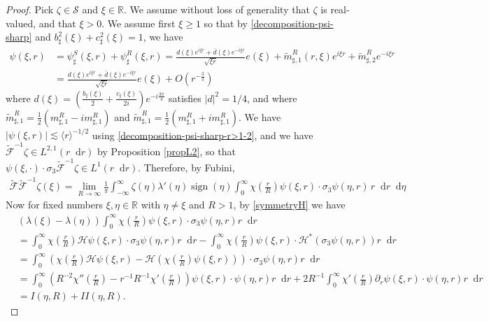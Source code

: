\documentclass[11 pt]{amsart}
\theoremstyle{definition}
\theoremstyle{remark}
\numberwithin{equation}{section}
\newcommand{\dd}{\mathop{}\!\mathrm{d}}
\begin{document}
\begin{proof}
Pick $\zeta \in \mathcal S$ and $\xi\in \mathbb R$. We assume without loss of generality that $\zeta$ is real-valued, and that $\xi>0$. We assume first $\xi\geq 1$ so that by \eqref{decomposition-psi-sharp} and $b_\sharp^2(\xi)+c_\sharp^2(\xi)=1$, we have
\begin{align}
\label{decomposition-psi-sharp-r>1-1} \psi(\xi,r) &=\psi_\sharp^S(\xi,r) +\psi_\sharp^R(\xi,r)  = \frac{d(\xi)e^{i\xi r}+\bar d(\xi)e^{-i\xi r}}{\sqrt{\xi r}} e(\xi)+\widetilde m_{\sharp,1}^R(r,\xi)e^{i\xi r}+\widetilde m_{\sharp,2}^R e^{-i\xi r} \\
\label{decomposition-psi-sharp-r>1-2}& =  \frac{d(\xi)e^{i\xi r}+\bar d(\xi)e^{-i\xi r}}{\sqrt{\xi r}} e(\xi)+O\left(r^{-\frac 32}\right)
\end{align}
where $d(\xi)=(\frac{b_\sharp(\xi)}{2}+\frac{c_\sharp(\xi)}{2i})e^{-i\frac{3\pi}{4}}$ satisfies $|d|^2=1/4$, and where $\widetilde m_{\sharp,1}^R=\frac 12 (m_{\sharp,1}^R-i m_{\sharp,1}^R)$ and $\widetilde m_{\sharp,1}^R=\frac 12 ( m_{\sharp,1}^R +i m_{\sharp,1}^R)$. We have $|\psi(\xi,r)|\lesssim \langle r \rangle^{-1/2}$ using \eqref{decomposition-psi-sharp-r>1-2}, and we have $\widetilde{\mathcal F}^{-1} \zeta \in L^{2,1}(r\dd r)$ by Proposition \ref{propL2}, so that $\psi(\xi,\cdot)\cdot \sigma_3 \widetilde{\mathcal F}^{-1} \zeta \in L^1(r\dd r)$. Therefore, by Fubini,
\begin{align} \label{inversion-tildeF-tildeF-1-inter1}
\widetilde{\mathcal F} \widetilde{\mathcal F}^{-1} \zeta (\xi)
= \lim_{R \to \infty} \frac{1}{\pi} \int_{-\infty}^\infty  \zeta(\eta)  \lambda'(\eta)\operatorname{sign}(\eta)  \int_0^\infty \chi \left( \frac{r}{R} \right) \psi(\xi,r) \cdot \sigma_3  \psi(\eta,r)  \,r \dd r   \dd \eta 
\end{align}
Now for fixed numbers $\xi,\eta \in \mathbb R$ with $\eta\neq \xi$ and $R>1$, by \eqref{symmetryH} we have
\begin{align*}
& (\lambda(\xi)-\lambda(\eta))\int_0^\infty \chi(\frac{r}{R})\psi(\xi,r)\cdot \sigma_3 \psi(\eta,r)r\dd r \\
&= \int_0^\infty \chi(\frac{r}{R})\mathcal H\psi(\xi,r)\cdot \sigma_3 \psi(\eta,r)r\dd r-\int_0^\infty \chi(\frac{r}{R})\psi(\xi,r)\cdot \mathcal H^*(\sigma_3 \psi(\eta,r))r\dd r \\
&= \int_0^\infty \left( \chi(\frac{r}{R})\mathcal H\psi(\xi,r)-\mathcal H\left(\chi(\frac{r}{R})\psi(\xi,r)\right)\right)\cdot \sigma_3 \psi(\eta,r)r\dd r \\
&= \int_0^\infty \left(R^{-2}\chi''(\frac{r}{R})-r^{-1}R^{-1}\chi'(\frac{r}{R})\right)  \psi(\xi,r) \cdot  \psi(\eta,r)r\dd r+2R^{-1} \int_0^\infty \chi'(\frac{r}{R}) \partial_r \psi(\xi,r) \cdot  \psi(\eta,r)r\dd r \\
&= I(\eta,R)+II(\eta,R).
\end{align*}


\end{proof}
\end{document}
